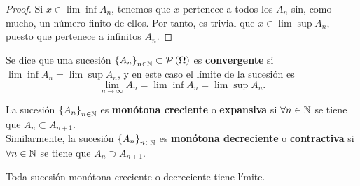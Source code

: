 \begin{proof}
Si $\displaystyle x \in \lim \inf A_{n} $, tenemos que $\displaystyle x $ pertenece a todos los $\displaystyle A_{n} $ sin, como mucho, un número finito de ellos. Por tanto, es trivial que $\displaystyle x \in \lim \sup A_{n} $, puesto que pertenece a infinitos $\displaystyle A_{n} $.
\end{proof}
\begin{definition}
	Se dice que una sucesión $\displaystyle \left\{ A_{n}\right\} _{n\in\mathbb{N}} \subset \mathcal{P}\left(\Omega \right) $ es \textbf{convergente} si $\displaystyle \lim \inf A_{n} = \lim \sup A_{n} $, y en este caso el límite de la sucesión es 
	\[\lim_{n \to \infty}A_{n} = \lim \inf A_{n} = \lim \sup A_{n} .\]
\end{definition}
\begin{definition}
	La sucesión $\displaystyle \left\{ A_{n}\right\} _{n\in\mathbb{N}} $ es \textbf{monótona creciente} o \textbf{expansiva} si $\displaystyle \forall n \in\mathbb{N} $ se tiene que $\displaystyle A_{n} \subset A_{n+1} $. \\
	Similarmente, la sucesión $\displaystyle \left\{ A_{n}\right\} _{n\in\mathbb{N}} $ es \textbf{monótona decreciente} o \textbf{contractiva} si $\displaystyle \forall n \in \mathbb{N} $ se tiene que $\displaystyle A_{n} \supset A_{n+1} $.
\end{definition}
\begin{prop}
Toda sucesión monótona creciente o decreciente tiene límite.
\end{prop}
